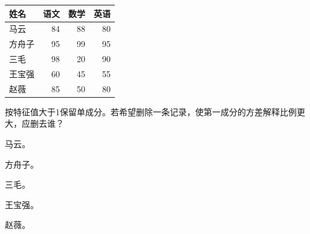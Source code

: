 \par\addvspace{6pt}\noindent\begin{minipage}{\linewidth}


\begin{center}\small\setlength{\tabcolsep}{4pt}\renewcommand{\arraystretch}{1.18}\begin{tabular}{@{}lrrr@{}}
\toprule
姓名 & 语文 & 数学 & 英语 \\
\midrule

马云 & 84 & 88 & 80 \\
方舟子 & 95 & 99 & 95 \\
三毛 & 98 & 20 & 90 \\
王宝强 & 60 & 45 & 55 \\
赵薇 & 85 & 50 & 80 \\
\bottomrule\end{tabular}\end{center}

按特征值大于1保留单成分。若希望删除一条记录，使第一成分的方差解释比例更大，应删去谁？


\begin{choices}

\item 马云。

\item 方舟子。

\item 三毛。

\item 王宝强。

\item 赵薇。

\end{choices}

\end{minipage}\par\vspace{4pt}

